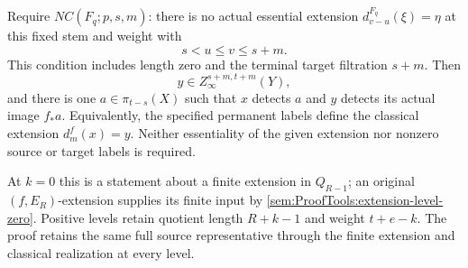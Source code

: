 \begin{proposition}
Require $NC(F_q;p,s,m)$: there is no actual essential extension
$d_{v-u}^{F_q}(\xi)=\eta$ at this fixed stem and weight with
\[
s<u\le v\le s+m.
\]
This condition includes length zero and the terminal target
filtration $s+m$. Then
\[
y\in Z_\infty^{s+m,t+m}(Y),
\]
and there is one $a\in\pi_{t-s}(X)$ such that $x$ detects $a$ and
$y$ detects its actual image $f_*a$. Equivalently, the specified
permanent labels define the classical extension $d_m^f(x)=y$.
Neither essentiality of the given extension nor nonzero source
or target labels is required.

At $k=0$ this is a statement about a finite extension in
$Q_{R-1}$; an original $(f,E_R)$-extension supplies its finite
input by \ref{sem:ProofTools:extension-level-zero}. Positive
levels retain quotient length $R+k-1$ and weight $t+e-k$.
The proof retains the same full source representative through
the finite extension and classical realization at every level.
\end{proposition}
